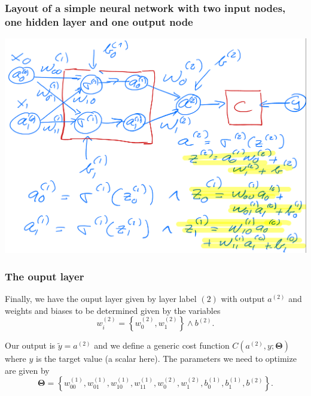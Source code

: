 \documentclass{beamer}
\begin{document}
\begin{frame}
\frametitle{Layout of a simple neural network with two input nodes, one  hidden layer and one output node}

\vspace{6mm}

\centerline{\includegraphics[width=1.0\linewidth]{figures/simplenn3.png}}

\vspace{6mm}
\end{frame}

\begin{frame}
\frametitle{The ouput layer}

Finally, we have the ouput layer given by layer label $(2)$ with output $a^{(2)}$ and weights and biases to be determined given by the variables
\[
w_{i}^{(2)}=\left\{w_{0}^{(2)},w_{1}^{(2)}\right\} \wedge b^{(2)}.
\]

Our output is $\tilde{y}=a^{(2)}$ and we define a generic cost function $C(a^{(2)},y;\bm{\Theta})$ where $y$ is the target value (a scalar here).
The parameters we need to optimize are given by
\[
\bm{\Theta}=\left\{w_{00}^{(1)},w_{01}^{(1)},w_{10}^{(1)},w_{11}^{(1)},w_{0}^{(2)},w_{1}^{(2)},b_0^{(1)},b_1^{(1)},b^{(2)}\right\}.
\]
\end{frame}
\end{document}
